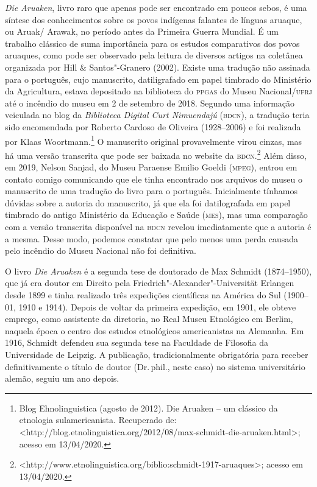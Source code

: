 \noindent{}\emph{Die Aruaken}, livro raro que apenas pode ser encontrado em poucos
sebos, é uma síntese dos conhecimentos sobre os povos indígenas falantes
de línguas aruaque, ou Aruak/ Arawak, no período antes da Primeira
Guerra Mundial. É um trabalho clássico de suma importância para os
estudos comparativos dos povos aruaques, como pode ser observado pela
leitura de diversos artigos na coletânea organizada por Hill \&
Santos"-Granero (2002). Existe uma tradução não assinada para o
português, cujo manuscrito, datiligrafado em papel timbrado do
Ministério da Agricultura, estava depositado na biblioteca do \textsc{ppgas} do
Museu Nacional/\textsc{ufrj} até o incêndio do museu em 2 de setembro de 2018.
Segundo uma informação veiculada no blog da \emph{Biblioteca Digital
Curt Nimuendajú} (\textsc{bdcn}), a tradução teria sido encomendada por Roberto
Cardoso de Oliveira (1928--2006) e foi realizada por Klaas
Woortmann.\footnote{Blog Ehnolinguistica (agosto de 2012). Die Aruaken --
  um clássico da etnologia sulamericanista. Recuperado de:
  \textless{}http://blog.etnolinguistica.org/2012/08/max-schmidt-die-aruaken.html\textgreater{};
  acesso em 13/04/2020.} O manuscrito original provavelmente virou
cinzas, mas há uma versão transcrita que pode ser baixada no website da
\textsc{bdcn}.\footnote{\textless{}http://www.etnolinguistica.org/biblio:schmidt-1917-aruaques\textgreater{};
  acesso em 13/04/2020.} Além disso, em 2019, Nelson Sanjad, do Museu
Paraense Emilio Goeldi (\textsc{mpeg}), entrou em contato comigo comunicando que
ele tinha encontrado nos arquivos do museu o manuscrito de uma tradução
do livro para o português. Inicialmente tínhamos dúvidas sobre a
autoria do manuscrito, já que ela foi datilografada em papel timbrado do
antigo Ministério da Educação e Saúde (\textsc{mes}), mas uma comparação com a
versão transcrita disponível na \textsc{bdcn} revelou imediatamente que a autoria
é a mesma. Desse modo, podemos constatar que pelo menos uma perda
causada pelo incêndio do Museu Nacional não foi definitiva.

O livro \emph{Die Aruaken} é a segunda tese de doutorado de Max Schmidt
(1874--1950), que já era doutor em Direito pela
Friedrich"-Alexander"-Universität Erlangen desde 1899 e tinha realizado
três expedições científicas na América do Sul (1900--01, 1910 e 1914).
Depois de voltar da primeira expedição, em 1901, ele obteve emprego,
como assistente da diretoria, no Real Museu Etnológico em Berlim,
naquela época o centro dos estudos etnológicos americanistas na
Alemanha. Em 1916, Schmidt defendeu sua segunda tese na Faculdade de
Filosofia da Universidade de Leipzig. A publicação, tradicionalmente
obrigatória para receber definitivamente o título de doutor (Dr.\,phil.,
neste caso) no sistema universitário alemão, seguiu um ano depois.

